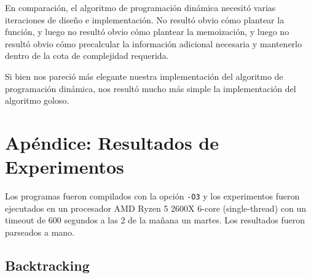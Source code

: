 \documentclass[10pt, a4paper]{article}
\begin{document}
En comparación, el algoritmo de programación dinámica necesitó varias iteraciones de diseño e implementación. No resultó obvio cómo plantear la función, y luego no resultó obvio cómo plantear la memoización, y luego no resultó obvio cómo precalcular la información adicional necesaria y mantenerlo dentro de la cota de complejidad requerida.

Si bien nos pareció más elegante nuestra implementación del algoritmo de programación dinámica, nos resultó mucho más simple la implementación del algoritmo goloso.

\clearpage

\section{Apéndice: Resultados de Experimentos}
Los programas fueron compilados con la opción \texttt{-O3} y los experimentos fueron ejecutados en un procesador AMD Ryzen 5 2600X 6-core (single-thread) con un timeout de 600 segundos a las 2 de la mañana un martes. Los resultados fueron parseados a mano.

\subsection{Backtracking}
\end{document}
